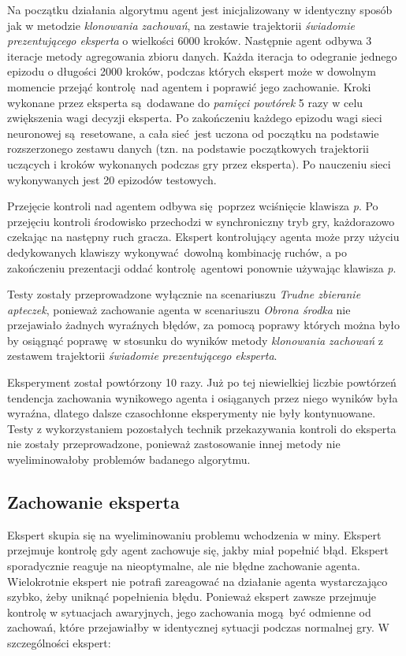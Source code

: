 \documentclass[polish,master,a4paper,oneside]{ppfcmthesis}
\begin{document}
Na początku działania algorytmu agent jest inicjalizowany w identyczny sposób jak w metodzie \textit{klonowania zachowań}, na zestawie trajektorii \textit{świadomie prezentującego eksperta} o wielkości 6000 kroków. Następnie agent odbywa 3 iteracje metody agregowania zbioru danych. Każda iteracja to odegranie jednego epizodu o długości 2000 kroków, podczas których ekspert może w dowolnym momencie przejąć kontrolę nad agentem i poprawić jego zachowanie. Kroki wykonane przez eksperta są dodawane do \textit{pamięci powtórek} 5 razy w celu zwiększenia wagi decyzji eksperta. Po zakończeniu każdego epizodu wagi sieci neuronowej są resetowane, a cała sieć jest uczona od początku na podstawie rozszerzonego zestawu danych (tzn. na podstawie początkowych trajektorii uczących i kroków wykonanych podczas gry przez eksperta). Po nauczeniu sieci wykonywanych jest 20 epizodów testowych.

Przejęcie kontroli nad agentem odbywa się poprzez wciśnięcie klawisza \textit{p}. Po przejęciu kontroli środowisko przechodzi w synchroniczny tryb gry, każdorazowo czekając na następny ruch gracza. Ekspert kontrolujący agenta może przy użyciu dedykowanych klawiszy wykonywać dowolną kombinację ruchów, a po zakończeniu prezentacji oddać kontrolę agentowi ponownie używając klawisza \textit{p}.

Testy zostały przeprowadzone wyłącznie na scenariuszu \textit{Trudne zbieranie apteczek}, ponieważ zachowanie agenta w scenariuszu \textit{Obrona środka} nie przejawiało żadnych wyraźnych błędów, za pomocą poprawy których można było by osiągnąć poprawę w stosunku do wyników metody \textit{klonowania zachowań} z zestawem trajektorii \textit{świadomie prezentującego eksperta}.

Eksperyment został powtórzony 10 razy. Już po tej niewielkiej liczbie powtórzeń tendencja zachowania wynikowego agenta i osiąganych przez niego wyników była wyraźna, dlatego dalsze czasochłonne eksperymenty nie były kontynuowane. Testy z wykorzystaniem pozostałych technik przekazywania kontroli do eksperta nie zostały przeprowadzone, ponieważ zastosowanie innej metody nie wyeliminowałoby problemów badanego algorytmu.

\subsection {Zachowanie eksperta}
Ekspert skupia się na wyeliminowaniu problemu wchodzenia w miny. Ekspert przejmuje kontrolę gdy agent zachowuje się, jakby miał popełnić błąd. Ekspert sporadycznie reaguje na nieoptymalne, ale nie błędne zachowanie agenta. Wielokrotnie ekspert nie potrafi zareagować na działanie agenta wystarczająco szybko, żeby uniknąć popełnienia błędu. Ponieważ ekspert zawsze przejmuje kontrolę w sytuacjach awaryjnych, jego zachowania mogą być odmienne od zachowań, które przejawiałby w identycznej sytuacji podczas normalnej gry. W szczególności ekspert:
\end{document}
